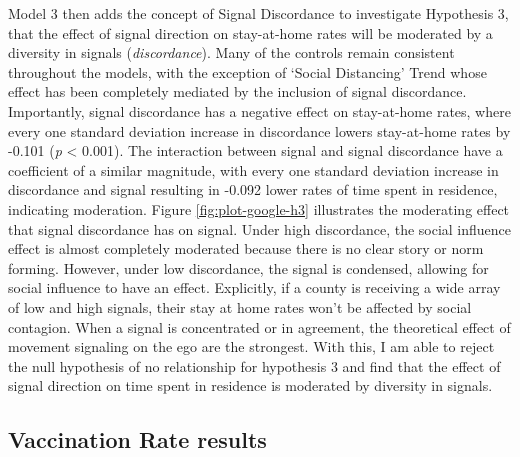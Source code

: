 Model 3 then adds the concept of Signal Discordance to investigate Hypothesis 3,
that the effect of signal direction on stay-at-home rates will be moderated by a
diversity in signals (\emph{discordance}). Many of the controls remain consistent
throughout the models, with the exception of `Social Distancing' Trend whose
effect has been completely mediated by the inclusion of signal discordance.
Importantly, signal discordance has a negative effect on stay-at-home rates,
where every one standard deviation increase in discordance lowers stay-at-home rates by
-0.101
(\emph{p} \textless{} 0.001). The interaction between signal and signal discordance have a
coefficient of a similar magnitude, with every one standard deviation increase
in discordance and signal resulting in
-0.092
lower rates of time spent in residence, indicating moderation. Figure
\ref{fig:plot-google-h3} illustrates the moderating effect that signal
discordance has on signal. Under high discordance, the social influence effect
is almost completely moderated because there is no clear story or norm forming.
However, under low discordance, the signal is condensed, allowing for social
influence to have an effect. Explicitly, if a county is receiving a wide array
of low and high signals, their stay at home rates won't be affected by social
contagion. When a signal is concentrated or in agreement, the theoretical effect
of movement signaling on the ego are the strongest. With this, I am able to
reject the null hypothesis of no relationship for hypothesis 3 and find that the
effect of signal direction on time spent in residence is moderated by diversity
in signals.

\hypertarget{vaccination-rate-results}{%
\subsection{Vaccination Rate results}\label{vaccination-rate-results}}



